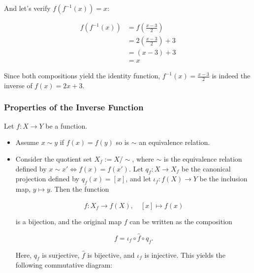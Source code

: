 And let's verify \(f(f^{-1}(x)) = x\):

\begin{align*}
	f(f^{-1}(x)) & = f\left(\frac{x - 3}{2}\right)     \\
	             & = 2\left(\frac{x - 3}{2}\right) + 3 \\
	             & = (x - 3) + 3                       \\
	             & = x
\end{align*}

Since both compositions yield the identity function, \(f^{-1} (x) = \frac{x - 3}{2}\) is indeed the 
inverse of \(f (x) = 2x + 3\).

\subsubsection{Properties of the Inverse Function}

Let \(f:X\to Y\) be a function.

\begin{itemize}

	\item Assume \(x \sim y \) if \(f(x)= f(y)\) so is \(\sim\) an equivalence relation.

	\item Consider the quotient set \( X_f := X/\sim \), where \( \sim \) is the equivalence relation 
	      defined by \( x \sim x' \iff f(x) = f(x') \). Let \( q_f : X \to X_f \) be the canonical 
		  projection defined by \( q_f(x) = [x] \), and let \( \iota_f : f(X) \to Y \) be the inclusion  
		  map, \( y \mapsto y \). Then the function
	      
		  \[
		      \hat{f} : X_f \to f(X), \quad [x] \mapsto f(x)
	      \]
	  
		  is a bijection, and the original map \(f\) can be written as the composition
	 
		  \[
		      f = \iota_f \circ \hat{f} \circ q_f.
	      \]
	 
		  Here, \( q_f \) is surjective, \( \hat{f} \) is bijective, and \( \iota_f \) is injective. 
		  This yields the following commutative diagram:
	      
		  \begin{center}
	      \end{center}

\end{itemize}

